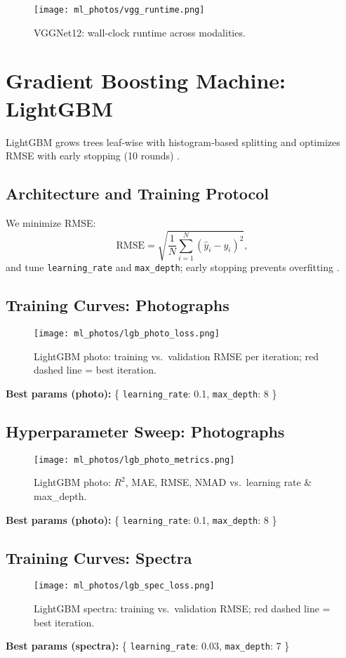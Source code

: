 \documentclass[english,bachelor,oneside]{ctufit-thesis}
\begin{document}
\begin{figure}[H]
  \centering
  \texttt{[image: ml\_photos/vgg\_runtime.png]}
  \caption{VGGNet12: wall‐clock runtime across modalities.}
  \label{fig:vgg_runtime}
\end{figure}

\section{Gradient Boosting Machine: LightGBM}
LightGBM grows trees leaf‐wise with histogram‐based splitting and optimizes RMSE with early stopping (10 rounds) \cite{Ke2017,Friedman2001}.

\subsection{Architecture and Training Protocol}
We minimize RMSE:
\[
  \mathrm{RMSE} = \sqrt{\frac1N\sum_{i=1}^N(\hat y_i - y_i)^2},
\]
and tune \texttt{learning\_rate} and \texttt{max\_depth}; early stopping prevents overfitting \cite{Probst2019}.

\subsection{Training Curves: Photographs}
\begin{figure}[H]
  \centering
  \texttt{[image: ml\_photos/lgb\_photo\_loss.png]}
  \caption{LightGBM photo: training vs.\ validation RMSE per iteration; red dashed line = best iteration.}
  \label{fig:lgb_photo_loss}
\end{figure}
\noindent\textbf{Best params (photo):} \{ \texttt{learning\_rate}: 0.1, \texttt{max\_depth}: 8 \}\\

\subsection{Hyperparameter Sweep: Photographs}
\begin{figure}[H]
  \centering
  \texttt{[image: ml\_photos/lgb\_photo\_metrics.png]}
  \caption{LightGBM photo: $R^2$, MAE, RMSE, NMAD vs.\ learning rate \& max\_depth.}
  \label{fig:lgb_photo_metrics}
\end{figure}
\noindent\textbf{Best params (photo):} \{ \texttt{learning\_rate}: 0.1, \texttt{max\_depth}: 8 \}\\

\subsection{Training Curves: Spectra}
\begin{figure}[H]
  \centering
  \texttt{[image: ml\_photos/lgb\_spec\_loss.png]}
  \caption{LightGBM spectra: training vs.\ validation RMSE; red dashed line = best iteration.}
  \label{fig:lgb_spec_loss}
\end{figure}
\noindent\textbf{Best params (spectra):} \{ \texttt{learning\_rate}: 0.03, \texttt{max\_depth}: 7 \}\\
\end{document}
